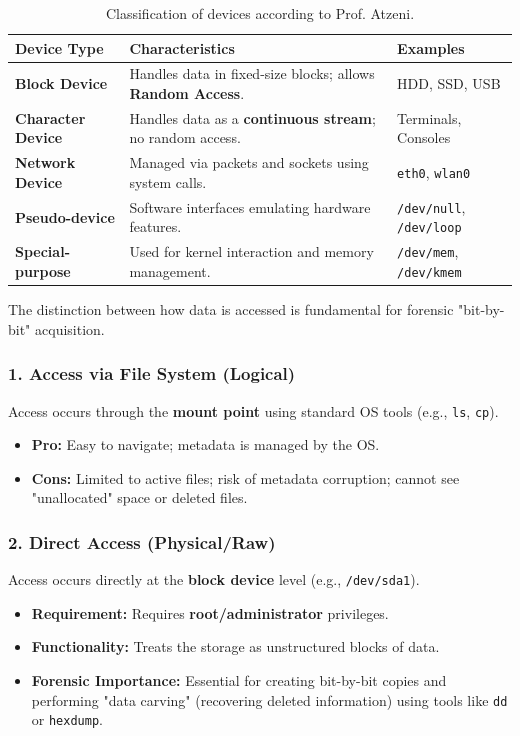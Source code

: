 \begin{table}[h!]
\centering
\small
\begin{tabular}{|l|p{6cm}|l|}
\hline
\textbf{Device Type} & \textbf{Characteristics} & \textbf{Examples} \\ \hline
\textbf{Block Device} & Handles data in fixed-size blocks; allows \textbf{Random Access}. & HDD, SSD, USB \\ \hline
\textbf{Character Device} & Handles data as a \textbf{continuous stream}; no random access. & Terminals, Consoles \\ \hline
\textbf{Network Device} & Managed via packets and sockets using system calls. & \texttt{eth0}, \texttt{wlan0} \\ \hline
\textbf{Pseudo-device} & Software interfaces emulating hardware features. & \texttt{/dev/null}, \texttt{/dev/loop} \\ \hline
\textbf{Special-purpose} & Used for kernel interaction and memory management. & \texttt{/dev/mem}, \texttt{/dev/kmem} \\ \hline
\end{tabular}
\caption{Classification of devices according to Prof. Atzeni.}
\end{table}

\noindent
The distinction between how data is accessed is fundamental for forensic "bit-by-bit" acquisition.

\subsubsection*{1. Access via File System (Logical)}
Access occurs through the \textbf{mount point} using standard OS tools (e.g., \texttt{ls}, \texttt{cp}).
\begin{itemize}
    \item \textbf{Pro:} Easy to navigate; metadata is managed by the OS.
    \item \textbf{Cons:} Limited to active files; risk of metadata corruption; cannot see "unallocated" space or deleted files.
\end{itemize}

\subsubsection*{2. Direct Access (Physical/Raw)}
Access occurs directly at the \textbf{block device} level (e.g., \texttt{/dev/sda1}).
\begin{itemize}
    \item \textbf{Requirement:} Requires \textbf{root/administrator} privileges.
    \item \textbf{Functionality:} Treats the storage as unstructured blocks of data.
    \item \textbf{Forensic Importance:} Essential for creating bit-by-bit copies and performing "data carving" (recovering deleted information) using tools like \texttt{dd} or \texttt{hexdump}.
\end{itemize}



